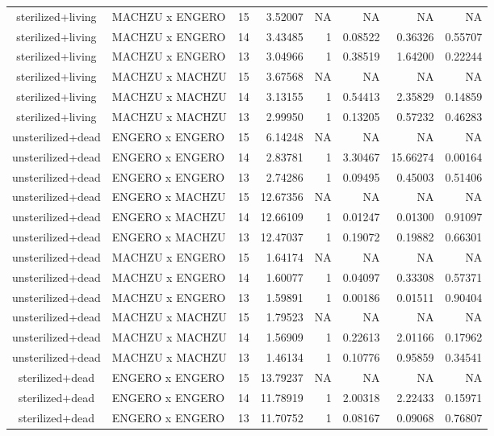 \begin{table}[t]
\begin{tabular*}{\linewidth}{@{\extracolsep{\fill}}clrrrrrr}
sterilized+living & MACHZU x ENGERO & 15 & 3.52007 & NA & NA & NA & NA \\ 
sterilized+living & MACHZU x ENGERO & 14 & 3.43485 & 1 & 0.08522 & 0.36326 & 0.55707 \\ 
sterilized+living & MACHZU x ENGERO & 13 & 3.04966 & 1 & 0.38519 & 1.64200 & 0.22244 \\ 
sterilized+living & MACHZU x MACHZU & 15 & 3.67568 & NA & NA & NA & NA \\ 
sterilized+living & MACHZU x MACHZU & 14 & 3.13155 & 1 & 0.54413 & 2.35829 & 0.14859 \\ 
sterilized+living & MACHZU x MACHZU & 13 & 2.99950 & 1 & 0.13205 & 0.57232 & 0.46283 \\ 
unsterilized+dead & ENGERO x ENGERO & 15 & 6.14248 & NA & NA & NA & NA \\ 
unsterilized+dead & ENGERO x ENGERO & 14 & 2.83781 & 1 & 3.30467 & 15.66274 & 0.00164 \\ 
unsterilized+dead & ENGERO x ENGERO & 13 & 2.74286 & 1 & 0.09495 & 0.45003 & 0.51406 \\ 
unsterilized+dead & ENGERO x MACHZU & 15 & 12.67356 & NA & NA & NA & NA \\ 
unsterilized+dead & ENGERO x MACHZU & 14 & 12.66109 & 1 & 0.01247 & 0.01300 & 0.91097 \\ 
unsterilized+dead & ENGERO x MACHZU & 13 & 12.47037 & 1 & 0.19072 & 0.19882 & 0.66301 \\ 
unsterilized+dead & MACHZU x ENGERO & 15 & 1.64174 & NA & NA & NA & NA \\ 
unsterilized+dead & MACHZU x ENGERO & 14 & 1.60077 & 1 & 0.04097 & 0.33308 & 0.57371 \\ 
unsterilized+dead & MACHZU x ENGERO & 13 & 1.59891 & 1 & 0.00186 & 0.01511 & 0.90404 \\ 
unsterilized+dead & MACHZU x MACHZU & 15 & 1.79523 & NA & NA & NA & NA \\ 
unsterilized+dead & MACHZU x MACHZU & 14 & 1.56909 & 1 & 0.22613 & 2.01166 & 0.17962 \\ 
unsterilized+dead & MACHZU x MACHZU & 13 & 1.46134 & 1 & 0.10776 & 0.95859 & 0.34541 \\ 
sterilized+dead & ENGERO x ENGERO & 15 & 13.79237 & NA & NA & NA & NA \\ 
sterilized+dead & ENGERO x ENGERO & 14 & 11.78919 & 1 & 2.00318 & 2.22433 & 0.15971 \\ 
sterilized+dead & ENGERO x ENGERO & 13 & 11.70752 & 1 & 0.08167 & 0.09068 & 0.76807 \\ 

\end{tabular*}
\end{table}
